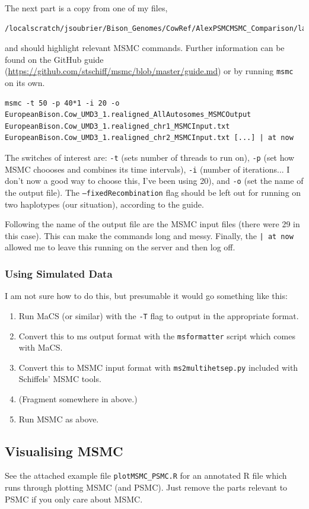 \documentclass[11pt,a4paper]{article}
\begin{document}
The next part is a copy from one of my files, 
\begin{lstlisting}
/localscratch/jsoubrier/Bison_Genomes/CowRef/AlexPSMCMSMC_Comparison/labBook
\end{lstlisting}
and should highlight relevant MSMC commands. Further information can be found on the GitHub guide (\url{https://github.com/stschiff/msmc/blob/master/guide.md}) or by running \texttt{msmc} on its own.
\begin{lstlisting}
msmc -t 50 -p 40*1 -i 20 -o EuropeanBison.Cow_UMD3_1.realigned_AllAutosomes_MSMCOutput EuropeanBison.Cow_UMD3_1.realigned_chr1_MSMCInput.txt EuropeanBison.Cow_UMD3_1.realigned_chr2_MSMCInput.txt [...] | at now
\end{lstlisting}
The switches of interest are: \texttt{-t} (sets number of threads to run on), \texttt{-p} (set how MSMC choooses and combines its time intervals), \texttt{-i} (number of iterations... I don't now a good way to choose this, I've been using 20), and \texttt{-o} (set the name of the output file). The \texttt{--fixedRecombination} flag should be left out for running on two haplotypes (our situation), according to the guide.

Following the name of the output file are the MSMC input files (there were 29 in this case). This can make the commands long and messy. Finally, the \texttt{| at now} allowed me to leave this running on the server and then log off.

\subsubsection{Using Simulated Data}
I am not sure how to do this, but presumable it would go something like this:
\begin{enumerate}
\item Run MaCS (or similar) with the \texttt{-T} flag to output in the appropriate format.
\item Convert this to ms output format with the \texttt{msformatter} script which comes with MaCS.
\item Convert this to MSMC input format with \texttt{ms2multihetsep.py} included with Schiffels' MSMC tools.
\item (Fragment somewhere in above.)
\item Run MSMC as above.
\end{enumerate}

\subsection{Visualising MSMC}
See the attached example file \texttt{plotMSMC\_PSMC.R} for an annotated R file which runs through plotting MSMC (and PSMC). Just remove the parts relevant to PSMC if you only care about MSMC.
\end{document}
